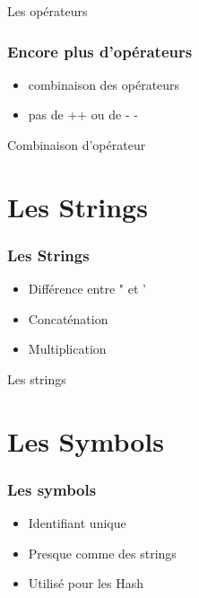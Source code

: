 \documentclass{beamer}
\begin{document}
\begin{frame}
  \begin{beamerboxesrounded}{Les op\'erateurs}
    
  \end{beamerboxesrounded}
\end{frame}

\begin{frame}
  \frametitle{Encore plus d'op\'erateurs}
  \begin{itemize}
    \item combinaison des op\'erateurs
    \item pas de ++ ou de - -
  \end{itemize}
\end{frame}

\begin{frame}
  \begin{beamerboxesrounded}{Combinaison d'op\'erateur}
    
  \end{beamerboxesrounded}
\end{frame}

\section{Les Strings}

\begin{frame}
  \frametitle{Les Strings}
  \begin{itemize}
    \item Diff\'erence entre " et '
    \item Concat\'enation
    \item Multiplication
  \end{itemize}
\end{frame}

\begin{frame}
  \begin{beamerboxesrounded}{Les strings}
    
  \end{beamerboxesrounded}
\end{frame}

\section{Les Symbols}

\begin{frame}
  \frametitle{Les symbols}
  \begin{itemize}
    \item Identifiant unique
    \item Presque comme des strings
    \item Utilis\'e  pour les Hash
  \end{itemize}
\end{frame}
\end{document}
